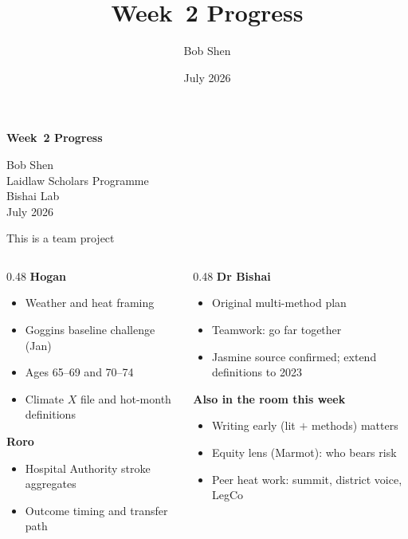 \documentclass[aspectratio=169,10pt]{beamer}
\title{Week~2 Progress}
\author{Bob Shen}
\date{July 2026}
\institute{Laidlaw Scholars Programme $\cdot$ Bishai Lab}
\begin{document}
\begin{frame}[plain]
  \vspace{1.8cm}
  {\color{LaidlawNavy}\LARGE\bfseries Week~2 Progress\par}

  \vspace{1.6em}
  {\normalsize Bob Shen\\[0.2em]
  Laidlaw Scholars Programme\\[0.2em]
  Bishai Lab\\[0.2em]
  July 2026\par}
\end{frame}

\begin{frame}{This is a team project}
  \begin{columns}[T]
    \begin{column}{0.48\textwidth}
      {\color{LaidlawTeal}\textbf{Hogan}}
      \begin{itemize}
        \item Weather and heat framing
        \item Goggins baseline challenge (Jan)
        \item Ages 65--69 and 70--74
        \item Climate $X$ file and hot-month definitions
      \end{itemize}
      \vspace{0.55em}
      {\color{LaidlawTeal}\textbf{Roro}}
      \begin{itemize}
        \item Hospital Authority stroke aggregates
        \item Outcome timing and transfer path
      \end{itemize}
    \end{column}
    \begin{column}{0.48\textwidth}
      {\color{LaidlawTeal}\textbf{Dr Bishai}}
      \begin{itemize}
        \item Original multi-method plan
        \item Teamwork: go far together
        \item Jasmine source confirmed; extend definitions to 2023
      \end{itemize}
      \vspace{0.55em}
      {\color{LaidlawTeal}\textbf{Also in the room this week}}
      \begin{itemize}
        \item Writing early (lit $+$ methods) matters
        \item Equity lens (Marmot): who bears risk
        \item Peer heat work: summit, district voice, LegCo
      \end{itemize}
    \end{column}
  \end{columns}


\end{frame}
\end{document}
